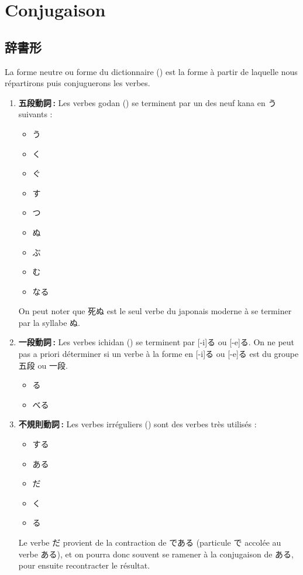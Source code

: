 \section{Conjugaison}

\subsection{辞書形}

La forme neutre ou forme du dictionnaire () est la forme à partir de laquelle nous répartirons puis conjuguerons les verbes.

\begin{enumerate}
    \item \textbf{五段動詞 :} Les verbes godan () se terminent par un des neuf kana en う suivants :
          \begin{itemize}
              \item {}う
              \item {}く
              \item {}ぐ
              \item {}す
              \item {}つ
              \item {}ぬ
              \item {}ぶ
              \item {}む
              \item なる
          \end{itemize}
          On peut noter que 死ぬ est le seul verbe du japonais moderne à se terminer par la syllabe ぬ.
    \item \textbf{一段動詞 :} Les verbes ichidan () se terminent par [-i]る ou [-e]る. On ne peut pas a priori déterminer si un verbe à la forme en [-i]る ou [-e]る est du groupe 五段 ou 一段.
          \begin{itemize}
              \item {}る
              \item {}べる
          \end{itemize}
    \item \textbf{不規則動詞 :} Les verbes irréguliers () sont des verbes très utilisés :
          \begin{itemize}
              \item する
              \item ある
              \item だ
              \item {}く
              \item {}る
          \end{itemize}
          Le verbe だ provient de la contraction de である (particule で accolée au verbe ある), et on pourra donc souvent se ramener à la conjugaison de ある, pour ensuite recontracter le résultat.
\end{enumerate}

